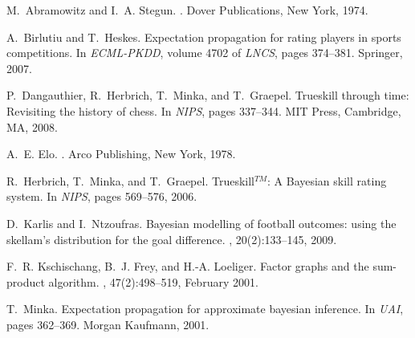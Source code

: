 \begin{thebibliography}{}



M.~Abramowitz and I.~A. Stegun.
.
\newblock Dover Publications, New York, 1974.

A.~Birlutiu and T.~Heskes.
\newblock Expectation propagation for rating players in sports competitions.
\newblock In {\em ECML-PKDD}, volume 4702 of {\em LNCS}, pages
  374--381. Springer, 2007.

P.~Dangauthier, R.~Herbrich, T.~Minka, and T.~Graepel.
\newblock Trueskill through time: Revisiting the history of chess.
\newblock In {\em NIPS}, pages 337--344. MIT
  Press, Cambridge, MA, 2008.

A.~E. Elo.
.
\newblock Arco Publishing, New York, 1978.

R.~Herbrich, T.~Minka, and T.~Graepel.
\newblock Trueskill$^{TM}$: A {B}ayesian skill rating system.
\newblock In {\em NIPS}, pages 569--576, 2006.

D.~Karlis and I.~Ntzoufras.
\newblock Bayesian modelling of football outcomes: using the skellam's
  distribution for the goal difference.
, 20(2):133--145, 2009.

F.~R. Kschischang, B.~J. Frey, and H.-A. Loeliger.
\newblock Factor graphs and the sum-product algorithm.
, 47(2):498--519,
  February 2001.

T.~Minka.
\newblock Expectation propagation for approximate bayesian inference.
\newblock In {\em UAI}, pages
  362--369. Morgan Kaufmann, 2001.




\end{thebibliography}
